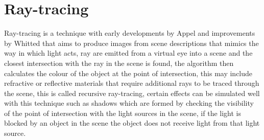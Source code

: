 %


\section{Ray-tracing}
Ray-tracing is a technique with early developments by Appel \cite{Appel68} and improvements by Whitted \cite{whitted79a} that aims to produce images from scene descriptions that mimics the way
in which light acts, ray are emitted from a virtual eye into a scene and the closest intersection with the ray in the scene is
found, the algorithm then calculates the colour of the object at the point of intersection, this may include refractive or
reflective materials that require additional rays to be traced through the scene, this is called recursive ray-tracing, certain effects can be simulated well with this technique such as shadows which are formed by checking the visibility
of the point of intersection with the light sources in the scene, if the light is blocked by an object in the scene
the object does not receive light from that light source.
